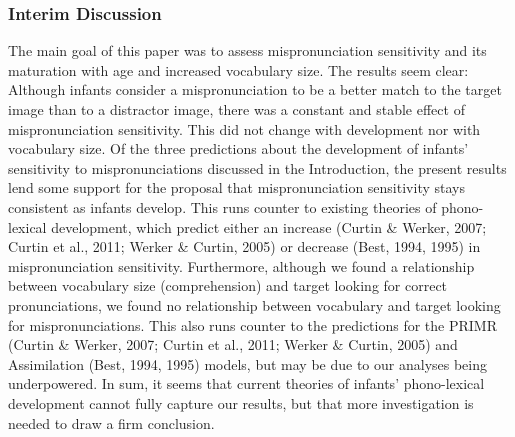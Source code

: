\documentclass[man]{apa6}
\theoremstyle{definition}
\theoremstyle{definition}
\theoremstyle{definition}
\theoremstyle{remark}
\begin{document}
\subsubsection{Interim Discussion}\label{interim-discussion}

The main goal of this paper was to assess mispronunciation sensitivity
and its maturation with age and increased vocabulary size. The results
seem clear: Although infants consider a mispronunciation to be a better
match to the target image than to a distractor image, there was a
constant and stable effect of mispronunciation sensitivity. This did not
change with development nor with vocabulary size. Of the three
predictions about the development of infants' sensitivity to
mispronunciations discussed in the Introduction, the present results
lend some support for the proposal that mispronunciation sensitivity
stays consistent as infants develop. This runs counter to existing
theories of phono-lexical development, which predict either an increase
(Curtin \& Werker, 2007; Curtin et al., 2011; Werker \& Curtin, 2005) or
decrease (Best, 1994, 1995) in mispronunciation sensitivity.
Furthermore, although we found a relationship between vocabulary size
(comprehension) and target looking for correct pronunciations, we found
no relationship between vocabulary and target looking for
mispronunciations. This also runs counter to the predictions for the
PRIMR (Curtin \& Werker, 2007; Curtin et al., 2011; Werker \& Curtin,
2005) and Assimilation (Best, 1994, 1995) models, but may be due to our
analyses being underpowered. In sum, it seems that current theories of
infants' phono-lexical development cannot fully capture our results, but
that more investigation is needed to draw a firm conclusion.
\end{document}

